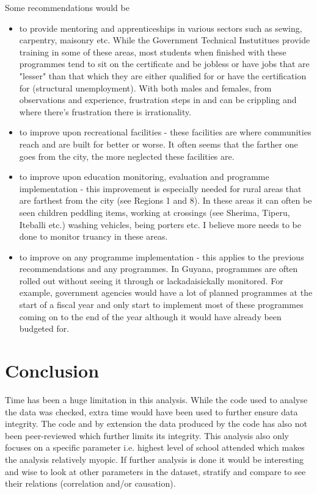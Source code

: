 \documentclass[stu, 12pt, floatsintext,longtable]{apa7}
\begin{document}
Some recommendations would be
\begin{itemize}
    \item to provide mentoring and apprenticeships in various sectors such as
          sewing,
          carpentry, maisonry etc. While the Government Technical Instutitues
          provide training
          in some of these areas, most students when finished with these
          programmes tend to sit on the certificate and be jobless or have jobs
          that are "lesser" than that which they are either qualified for or
          have the
          certification for (structural unemployment). With both males and
          females, from observations and
          experience, frustration
          steps in and can be crippling and where there's frustration there is
          irrationality.
    \item to improve upon recreational facilities - these facilities are where
          communities reach and are built for better or worse. It often seems
          that the farther
          one goes from the city, the more neglected these facilities are.
    \item to improve upon education monitoring, evaluation and programme
          implementation - this improvement is especially needed for rural
          areas that are farthest from the city (see Regions 1 and 8). In these
          areas
          it can often be seen
          children peddling items, working at crossings (see Sherima, Tiperu,
          Iteballi
          etc.) washing vehicles, being porters etc. I believe more needs to be
          done to monitor
          truancy in these areas.
    \item to improve on any programme implementation - this applies to the
          previous recommendations
          and any programmes. In Guyana, programmes are
          often rolled out without seeing it through or lackadaisickally
          monitored. For example, government agencies would have a lot of
          planned programmes at the start of
          a fiscal year and only start to implement most of these programmes
          coming on to the end of the year although
          it would have already been budgeted for.
\end{itemize}
\section{Conclusion}
Time has been a huge limitation in this analysis.
While the code used to analyse the data was checked, extra time would have been
used to further ensure data integrity. The code and by extension the data
produced
by
the code has also not been peer-reviewed which further limits its integrity.
This analysis
also only focuses on a specific parameter i.e. highest level of school
attended which makes the analysis relatively myopic. If further analysis is
done
it would be interesting and wise to look at other parameters in the dataset,
stratify and compare to see their relations (correlation and/or causation).
\printbibliography
\end{document}

